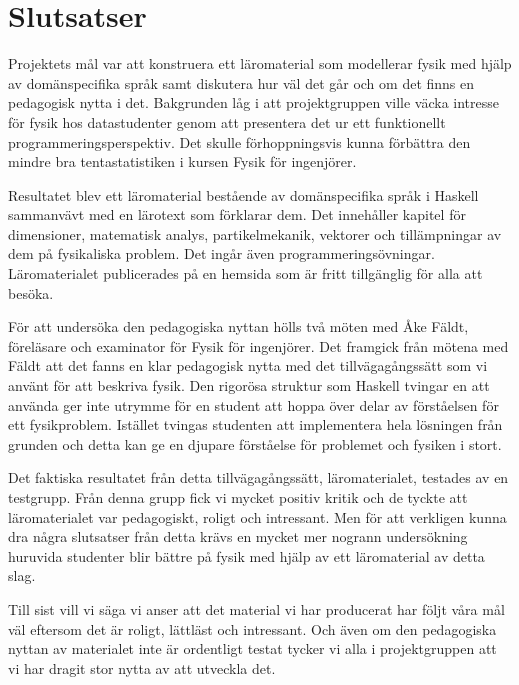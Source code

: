 
\chapter{Slutsatser}

Projektets mål var att konstruera ett läromaterial som modellerar fysik med
hjälp av domänspecifika språk samt diskutera hur väl det går och om det finns en
pedagogisk nytta i det. Bakgrunden låg i att projektgruppen ville väcka intresse
för fysik hos datastudenter genom att presentera det ur ett funktionellt
programmeringsperspektiv. Det skulle förhoppningsvis kunna förbättra den mindre
bra tentastatistiken i kursen Fysik för ingenjörer.

Resultatet blev ett läromaterial bestående av domänspecifika språk i Haskell
sammanvävt med en lärotext som förklarar dem. Det innehåller kapitel för
dimensioner, matematisk analys, partikelmekanik, vektorer och tillämpningar av
dem på fysikaliska problem. Det ingår även programmeringsövningar.
Läromaterialet publicerades på en hemsida som är fritt tillgänglig för alla att
besöka.

För att undersöka den pedagogiska nyttan hölls två möten med Åke Fäldt, föreläsare och examinator för Fysik
för ingenjörer. Det framgick från mötena med Fäldt att det fanns en klar
pedagogisk nytta med det tillvägagångssätt som vi använt för att beskriva fysik.
Den rigorösa struktur som Haskell tvingar en att använda ger inte utrymme för en
student att hoppa över delar av förståelsen för ett fysikproblem. Istället
tvingas studenten att implementera hela lösningen från grunden och detta kan
ge en djupare förståelse för problemet och fysiken i stort. 

Det faktiska resultatet från detta tillvägagångssätt, läromaterialet,
testades av en testgrupp. Från denna grupp fick vi mycket positiv kritik och de
tyckte att läromaterialet var pedagogiskt, roligt och intressant. Men för att
verkligen kunna dra några slutsatser från detta krävs en mycket mer nogrann
undersökning huruvida studenter blir bättre på fysik med hjälp av ett
läromaterial av detta slag.

Till sist vill vi säga vi anser att det material vi har producerat har följt våra mål väl eftersom det är roligt, lättläst och intressant. Och även om den pedagogiska nyttan av materialet inte är ordentligt testat tycker vi alla i projektgruppen att vi har dragit stor nytta av att utveckla det.
